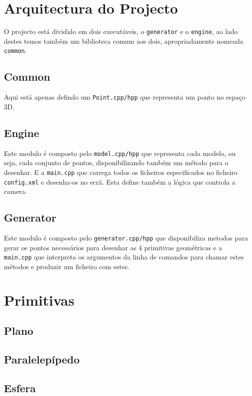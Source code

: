 \documentclass[a4paper]{article}
\begin{document}
\section{Arquitectura do Projecto}
O projecto está dividido em dois executáveis, o \texttt{generator} e o \texttt{engine}, ao lado destes temos também um biblioteca comum aos dois, apropriadamente nomeada \texttt{common}.

\subsection{Common}

Aqui está apenas defindo um \texttt{Point.cpp/hpp} que representa um ponto no espaço 3D.

\subsection{Engine}

Este modulo é composto pelo \texttt{model.cpp/hpp} que representa cada modelo, ou seja, cada conjunto de pontos, disponibilizando também um método para o desenhar. E a \texttt{main.cpp} que carrega todos os ficheiros especificados no ficheiro \texttt{config.xml} e desenha-os no ecrã. Esta define também a lógica que controla a camera.

\subsection{Generator}

Este modulo é composto pelo \texttt{generator.cpp/hpp} que disponibiliza metodos para gerar os pontos necessários para desenhar as 4 primitivas geométricas e a \texttt{main.cpp} que interpreta os argumentos da linha de comandos para chamar estes métodos e produzir um ficheiro com estes.

\section{Primitivas}
\subsection{Plano}

\subsection{Paralelepípedo}

\subsection{Esfera}
\end{document}
